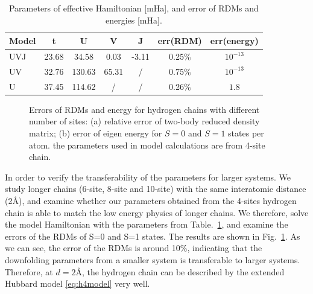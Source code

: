 \documentclass[prl,12pt,onecolumn,nofootinbib,notitlepage,english,superscriptaddress]{revtex4-1}
\begin{document}
\begin{table}[hbt]
\centering
\caption{Parameters of effective Hamiltonian [mHa], and error of RDMs and energies [mHa].}\label{tab:effm_hchain}
\begin{tabular}{||l|c|c|c|c||c|c||}
\hline
Model & t & U & V & J & err(RDM) & err(energy)\\
\hline
\hline
UVJ & 23.68 & 34.58 & 0.03 & -3.11 & 0.25\% & $10^{-13}$\\
UV & 32.76 & 130.63 & 65.31 & / & 0.75\% & $10^{-13}$\\
U & 37.45 & 114.62 & / & / & 0.26\% & $1.8$\\
\hline
\end{tabular}
\end{table}

\begin{figure}[hbt]
\centering
{}
\caption{Errors of RDMs and energy for hydrogen chains with different number of sites: (a) relative error of two-body reduced density matrix; (b) error of eigen energy for $S=0$ and $S=1$ states per atom. the parameters used in model calculations are from 4-site chain.}\label{fig:h4transfer}
\end{figure}
In order to verify the transferability of the parameters for larger systems. We study longer chains (6-site, 8-site and 10-site) with the same interatomic distance (2\AA), and examine whether our parameters obtained from the 4-sites hydrogen chain is able to match the low energy physics of longer chains. We therefore, solve the model Hamiltonian with the parameters
from Table.~\ref{tab:effm_hchain}, and examine the errors of the RDMs of S=0 and S=1 states. The results are
shown in Fig.~\ref{fig:h4transfer}. As we can see, the error of the RDMs is around 10\%, indicating that the downfolding parameters from a smaller system is transferable to larger systems.
Therefore, at $d=2$\AA, the hydrogen chain can be described by the extended Hubbard model \eqref{eq:h4model} very well. 
\end{document}
